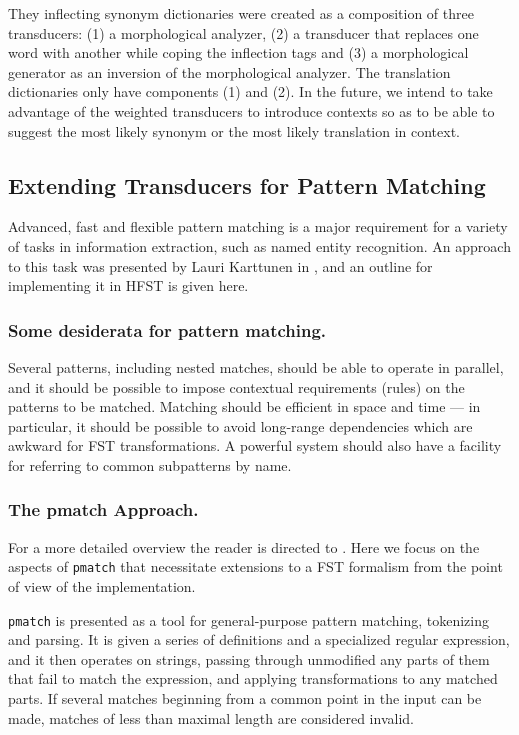\documentclass{llncs}
\begin{document}
They inflecting synonym dictionaries were created as a composition of three transducers: (1) a morphological analyzer, (2) a transducer that replaces one word with another while coping the inflection tags and (3) a morphological generator as an inversion of the morphological analyzer. The translation dictionaries only have components (1) and (2). In the future, we intend to take advantage of the weighted transducers to introduce contexts so as to be able to suggest the most likely synonym or the most likely translation in context.

\subsection{Extending Transducers for Pattern Matching}

Advanced, fast and flexible pattern matching is a major requirement for a
variety of tasks in information extraction, such as named entity recognition.
An approach to this task was presented by Lauri Karttunen in
\cite{karttunen/2011}, and an outline for implementing it in HFST is given here.

\subsubsection{Some desiderata for pattern matching.} Several patterns,
including nested matches, should be able to operate in parallel, and
it should be possible to impose contextual requirements (rules) on
the patterns to be matched. Matching should be efficient in space and
time --- in particular, it should be possible to avoid long-range
dependencies which are awkward for FST transformations.
A powerful system should also have a facility for referring
to common subpatterns by name.

\subsubsection{The pmatch Approach.}

For a more detailed overview the reader is directed to \cite{karttunen/2011}.
Here we focus on the aspects of \verb!pmatch! that necessitate extensions
to a FST formalism from the point of view of the implementation.

\verb!pmatch! is presented as a tool for general-purpose pattern matching,
tokenizing and parsing. It is given a series of definitions and a
specialized regular expression, and it then operates on strings, passing
through unmodified any parts of them that fail to match the expression,
and applying transformations to any matched parts. If several matches beginning
from a common point in the input can be made, matches of less than maximal
length are considered invalid.
\end{document}
